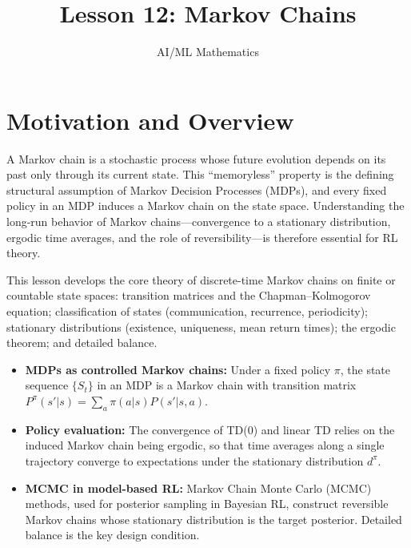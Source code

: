 \documentclass[11pt,a4paper]{article}
\title{Lesson 12: Markov Chains}
\author{AI/ML Mathematics}
\date{}
\begin{document}
\maketitle
\tableofcontents
\newpage


\section{Motivation and Overview}
\label{sec:motivation}

A Markov chain is a stochastic process whose future evolution
depends on its past only through its current state.  This
``memoryless'' property is the defining structural assumption of
Markov Decision Processes (MDPs), and every fixed policy in an MDP
induces a Markov chain on the state space.  Understanding the
long-run behavior of Markov chains---convergence to a stationary
distribution, ergodic time averages, and the role of
reversibility---is therefore essential for RL theory.

This lesson develops the core theory of discrete-time Markov chains
on finite or countable state spaces: transition matrices and the
Chapman--Kolmogorov equation; classification of states
(communication, recurrence, periodicity); stationary distributions
(existence, uniqueness, mean return times); the ergodic theorem;
and detailed balance.

\begin{rlconnection}[title={Why This Matters for RL}]
\begin{itemize}[nosep]
  \item \textbf{MDPs as controlled Markov chains:}
    Under a fixed policy $\pi$, the state sequence $\{S_t\}$ in
    an MDP is a Markov chain with transition matrix
    $P^\pi(s'|s) = \sum_a \pi(a|s) P(s'|s,a)$.
  \item \textbf{Policy evaluation:}
    The convergence of TD(0) and linear TD relies on the induced
    Markov chain being ergodic, so that time averages along a
    single trajectory converge to expectations under the
    stationary distribution $d^\pi$.
  \item \textbf{MCMC in model-based RL:}
    Markov Chain Monte Carlo (MCMC) methods, used for posterior
    sampling in Bayesian RL, construct reversible Markov chains
    whose stationary distribution is the target posterior.
    Detailed balance is the key design condition.
\end{itemize}
\end{rlconnection}
\end{document}
